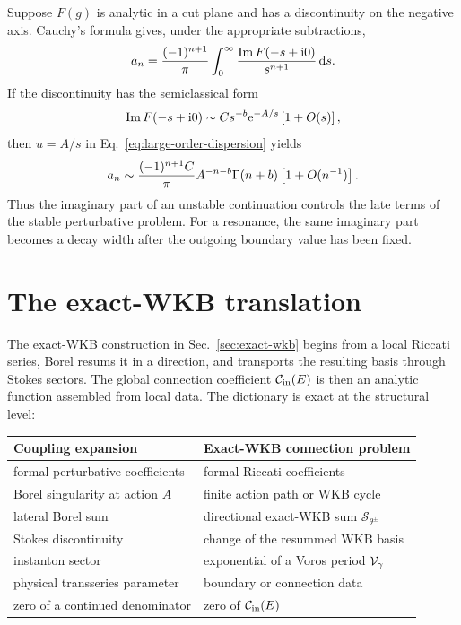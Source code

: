 Suppose $F(g)$ is analytic in a cut plane and has a discontinuity on the
negative axis.  Cauchy's formula gives, under the appropriate subtractions,
\begin{equation}
  a_n
  =\frac{(-1)^{n+1}}{\pi}
  \int_0^\infty
  \frac{\operatorname{Im} F(-s+\mathrm{i}0)}{s^{n+1}}\,\mathrm{d} s.
  \label{eq:large-order-dispersion}
\end{equation}
If the discontinuity has the semiclassical form
\begin{equation}
  \operatorname{Im} F(-s+\mathrm{i}0)
  \sim C s^{-b}\mathrm{e}^{-A/s}
  \left[1+O(s)\right],
  \label{eq:instanton-discontinuity}
\end{equation}
then $u=A/s$ in Eq.~\eqref{eq:large-order-dispersion} yields
\begin{equation}
  a_n\sim
  \frac{(-1)^{n+1}C}{\pi}
  A^{-n-b}\Gamma(n+b)
  \left[1+O(n^{-1})\right].
  \label{eq:instanton-large-order}
\end{equation}
Thus the imaginary part of an unstable continuation controls the late terms
of the stable perturbative problem.  For a resonance, the same imaginary
part becomes a decay width after the outgoing boundary value has been fixed.

\section{The exact-WKB translation}
\label{sec:resummation-wkb-dictionary}

The exact-WKB construction in Sec.~\ref{sec:exact-wkb} begins from a local
Riccati series, Borel resums it in a direction, and transports the resulting
basis through Stokes sectors.  The global connection coefficient
$\mathcal{C}_{\mathrm{in}}(E)$ is then an analytic function assembled from local data.  The
dictionary is exact at the structural level:
\begin{center}
\begin{tabularx}{\textwidth}{@{}>{\raggedright\arraybackslash}p{}
  >{\raggedright\arraybackslash}X@{}}
\toprule
Coupling expansion & Exact-WKB connection problem \\
\midrule
formal perturbative coefficients & formal Riccati coefficients \\
\addlinespace
Borel singularity at action $A$ & finite action path or WKB cycle \\
\addlinespace
lateral Borel sum & directional exact-WKB sum $\mathcal S_{\theta^\pm}$ \\
\addlinespace
Stokes discontinuity & change of the resummed WKB basis \\
\addlinespace
instanton sector & exponential of a Voros period $\mathcal{V}_\gamma$ \\
\addlinespace
physical transseries parameter & boundary or connection data \\
\addlinespace
zero of a continued denominator & zero of $\mathcal{C}_{\mathrm{in}}(E)$ \\
\bottomrule
\end{tabularx}
\end{center}

